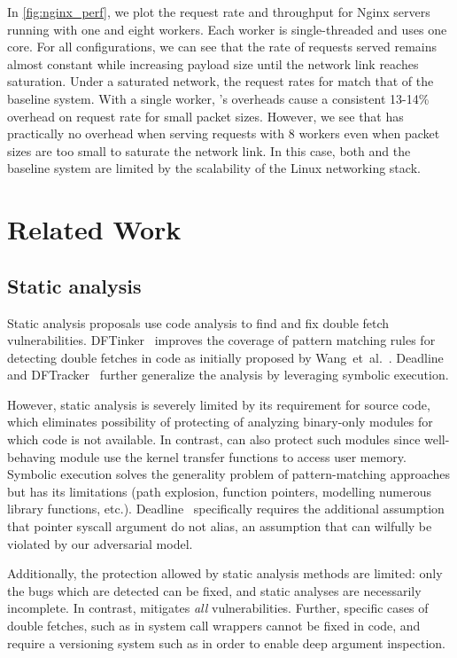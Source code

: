 \documentclass[letterpaper,twocolumn,10pt]{article}
\begin{document}
In \autoref{fig:nginx_perf}, we plot the request rate and throughput
for Nginx servers running with one and eight workers.
Each worker is single-threaded and uses one core.
For all configurations, we can see that the rate of requests served 
remains almost constant while increasing payload size until the network 
link reaches saturation.
Under a saturated network, the request rates for \tiktok match that 
of the baseline system.
With a single worker, \tiktok's overheads cause a consistent 13-14\% 
overhead on request rate for small packet sizes.
However, we see that \tiktok has practically no overhead when serving 
requests with 8 workers even when packet sizes are too small to 
saturate the network link.
In this case, both \tiktok and the baseline system are limited by the
scalability of the Linux networking stack.

\section{Related Work}

\subsection{Static analysis}

Static analysis proposals use code analysis to find and fix double fetch
vulnerabilities.
DFTinker~\cite{dftinker} improves the coverage of pattern matching rules 
for detecting double fetches in code as initially proposed by Wang~et~al.~\cite{wang2017double}.
Deadline~\cite{deadline} and DFTracker~\cite{wang2019dftracker} further 
generalize the analysis by leveraging symbolic execution.

However, static analysis is severely limited by its requirement for
source code, which eliminates possibility of protecting of analyzing 
binary-only modules for which code is not available. 
In contrast, \tiktok can also protect such modules since well-behaving
module use the kernel transfer functions to access user memory.
Symbolic execution solves the generality problem of pattern-matching 
approaches but has its limitations (path explosion, function pointers, 
modelling numerous library functions, etc.).
Deadline~\cite{deadline} specifically requires the additional assumption
that pointer syscall argument do not alias, an assumption that can 
wilfully be violated by our adversarial model.

Additionally, the protection allowed by static analysis methods are 
limited: only the bugs which are detected can be fixed, and static 
analyses are necessarily incomplete.
In contrast, \tiktok mitigates \emph{all} \tocttou vulnerabilities.
Further, specific cases of double fetches, such as in system call wrappers
cannot be fixed in code, and require a versioning system such as 
\tiktok in order to enable deep argument inspection.
\end{document}
